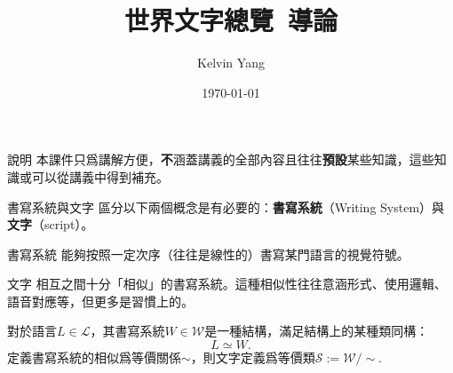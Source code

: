 \documentclass[aspectratio=169]{beamer}
\title{世界文字總覽~導論}
\author{Kelvin Yang}
\date{\today}
\begin{document}
\frame{\titlepage}

\begin{frame}{說明}
    本課件只爲講解方便，\textbf{不}涵蓋講義的全部內容且往往\textbf{預設}某些知識，這些知識或可以從講義中得到補充。
\end{frame}

\begin{frame}{書寫系統與文字}
    區分以下兩個概念是有必要的：\textbf{書寫系統}（Writing System）與\textbf{文字}（script）。

    \begin{block}{書寫系統}
        能夠按照一定次序（往往是線性的）書寫某門語言的視覺符號。
    \end{block}

    \begin{block}{文字}
        相互之間十分「相似」的書寫系統。這種相似性往往意涵形式、使用邏輯、語音對應等，但更多是習慣上的。
    \end{block}

    對於語言$L\in\mathcal{L}$，其書寫系統$W\in\mathcal{W}$是一種結構，滿足結構上的某種類同構：
    \[
        L\simeq W.
    \]
    定義書寫系統的相似爲等價關係$\sim$，則文字定義爲等價類$\mathcal{S}:=\mathcal{W}/\sim$.
\end{frame}
\end{document}
